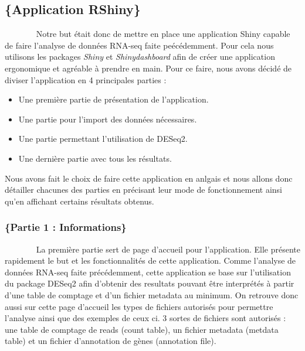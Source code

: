 \documentclass[
  12pt,
]{article}
\begin{document}

\newpage

\hypertarget{application-rshiny}{%
\subsection{\texorpdfstring{\large\{Application
RShiny\}}{\{Application RShiny\}}}\label{application-rshiny}}

~~~~~~~ Notre but était donc de mettre en place une application Shiny
capable de faire l'analyse de données RNA-seq faite peécédemment. Pour
cela nous utilisons les packages \emph{Shiny} et \emph{Shinydashboard}
afin de créer une application ergonomique et agréable à prendre en main.
Pour ce faire, nous avons décidé de diviser l'application en 4
principales parties :

\begin{itemize}
\item Une première partie de présentation de l'application.
\item Une partie pour l'import des données nécessaires.
\item Une partie permettant l'utilisation de DESeq2.
\item Une dernière partie avec tous les résultats.
\end{itemize}

Nous avons fait le choix de faire cette application en anlgais et nous
allons donc détailler chacunes des parties en précisant leur mode de
fonctionnement ainsi qu'en affichant certains résultats obtenus.

\hypertarget{partie-1-informations}{%
\subsubsection{\texorpdfstring{\normalsize\{Partie 1 :
Informations\}}{\{Partie 1 : Informations\}}}\label{partie-1-informations}}

~~~~~~~ La première partie sert de page d'accueil pour l'application.
Elle présente rapidement le but et les fonctionnalités de cette
application. Comme l'analyse de données RNA-seq faite précédemment,
cette application se base sur l'utilisation du package DESeq2 afin
d'obtenir des resultats pouvant être interprétés à partir d'une table de
comptage et d'un fichier metadata au minimum. On retrouve donc aussi sur
cette page d'accueil les types de fichiers autorisés pour permettre
l'analyse ainsi que des exemples de ceux ci. 3 sortes de fichiers sont
autorisés : une table de comptage de reads (count table), un fichier
metadata (metdata table) et un fichier d'annotation de gènes (annotation
file).
\end{document}
